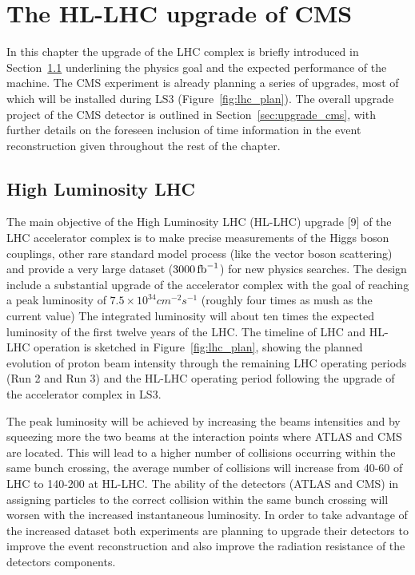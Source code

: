 \providecommand{\sixbysix}{\ensuremath{6\times 6\mathrm{~cm}^{2}}\xspace}
\providecommand{\threebythree}{\ensuremath{3\times 3\mathrm{~cm}^{2}}\xspace}
\providecommand{\twobytwo}{\ensuremath{2\times 2\mathrm{~cm}^{2}}\xspace}
\providecommand{\onebyone}{\ensuremath{1\times 1\mathrm{~cm}^{2}}\xspace}
\providecommand{\relChIso}{\ensuremath{Ch_{iso}/p_T^{muon}}}

\chapter{The HL-LHC upgrade of CMS}
\label{chapter:upgrade}

In this chapter the upgrade of the LHC complex is briefly introduced in Section~\ref{upgrade_lhc}
underlining the physics goal and the expected performance of the machine. The CMS experiment is already planning
a series of upgrades, most of which will be installed during LS3 (Figure~\ref{fig:lhc_plan}).
The overall upgrade project of the CMS detector is outlined in Section~\ref{sec:upgrade_cms}, with further details on the
foreseen inclusion of time information in the event reconstruction given throughout the rest of the chapter.

\section{High Luminosity LHC}
\label{upgrade_lhc}

The main objective of the High Luminosity LHC (HL-LHC) upgrade [9] of the LHC accelerator complex
is to make precise measurements of the Higgs boson couplings, other rare standard model process (like the vector boson scattering)
and provide a very large dataset ($3000\mathrm{\,fb}^{-1}$) for new physics searches.
The design include a substantial upgrade of the accelerator complex with the goal of reaching
a peak luminosity of $7.5\times10^{34} cm^{-2}s^{-1}$ (roughly four times as mush as the current value)
The integrated luminosity will about ten times the expected luminosity of the first twelve
years of the LHC.
The timeline of LHC and HL-LHC operation is sketched in Figure~\ref{fig:lhc_plan}, showing the planned
evolution of proton beam intensity through the remaining LHC operating periods (Run 2 and Run 3)
and the HL-LHC operating period following the upgrade of the accelerator complex in LS3.

The peak luminosity will be achieved by increasing the beams intensities and by squeezing more the two beams at the
interaction points where ATLAS and CMS are located.
This will lead to a higher number of collisions occurring within the same bunch crossing, the
average number of collisions will increase from 40-60 of LHC to 140-200 at HL-LHC.
The ability of the detectors (ATLAS and CMS) in assigning particles to the correct collision within the same bunch crossing
will worsen with the increased instantaneous luminosity. In order to take advantage of the increased dataset
both experiments are planning to upgrade their detectors to improve the event reconstruction and also improve
the radiation resistance of the detectors components.

